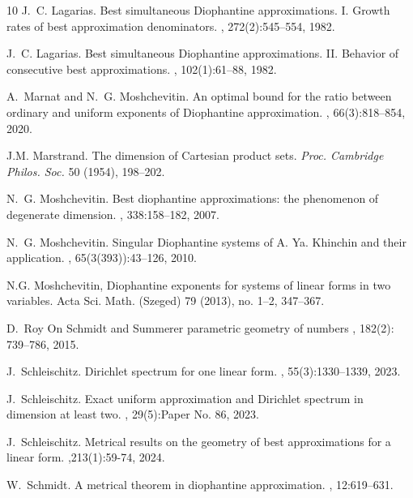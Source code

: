 \documentclass[10pt]{amsart}
\theoremstyle{definition}
\begin{document}
\begin{thebibliography}{10}
J.~C. Lagarias.
\newblock Best simultaneous {D}iophantine approximations. {I}. {G}rowth rates
  of best approximation denominators.
, 272(2):545--554, 1982.

J.~C. Lagarias.
\newblock Best simultaneous {D}iophantine approximations. {II}. {B}ehavior of
  consecutive best approximations.
, 102(1):61--88, 1982.

A.~Marnat and N.~G. Moshchevitin.
\newblock An optimal bound for the ratio between ordinary and uniform exponents
  of {D}iophantine approximation.
, 66(3):818--854, 2020.

 J.M. Marstrand. \newblock The dimension of Cartesian product sets. 
\newblock
{\em Proc. Cambridge Philos. Soc.} 50 (1954),
198–202.

N.~G. Moshchevitin.
\newblock Best diophantine approximations: the phenomenon of degenerate
  dimension.
, 338:158--182, 2007.

N.~G. Moshchevitin.
\newblock Singular {D}iophantine systems of {A}. {Y}a. {K}hinchin and their
  application.
, 65(3(393)):43--126, 2010.

 N.G. Moshchevitin, Diophantine exponents for systems of linear forms in two variables. Acta Sci. Math. (Szeged) 79 (2013), no. 1--2, 347--367.

D.~Roy
\newblock On {S}chmidt and {S}ummerer parametric geometry of numbers
, 182(2): 739--786, 2015. 

J.~Schleischitz.
\newblock Dirichlet spectrum for one linear form.
, 55(3):1330--1339, 2023.

J.~Schleischitz.
\newblock Exact uniform approximation and {D}irichlet spectrum in dimension at
  least two.
, 29(5):Paper No. 86, 2023.

J.~Schleischitz.
\newblock Metrical results on the geometry of best approximations for a linear
  form.
,213(1):59-74, 2024.

W.~Schmidt.
\newblock A metrical theorem in diophantine approximation.
, 12:619--631.


\end{thebibliography}
\end{document}

